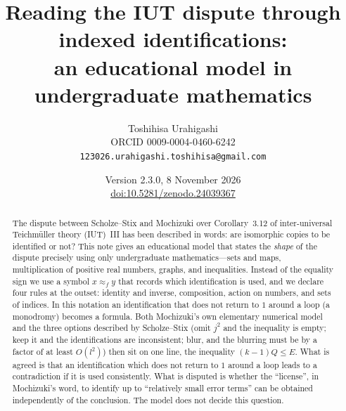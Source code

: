 \documentclass[11pt,a4paper]{article}
\title{Reading the IUT dispute through indexed identifications:\\ an educational model in undergraduate mathematics}
\author{Toshihisa Urahigashi\\\small ORCID 0009-0004-0460-6242\\\small\texttt{123026.urahigashi.toshihisa@gmail.com}}
\date{Version 2.3.0, 8 November 2026\\\small\href{https://doi.org/10.5281/zenodo.24039367}{doi:10.5281/zenodo.24039367}}
\newcommand{\q}[1]{``#1''}
\theoremstyle{plain}
\theoremstyle{definition}
\theoremstyle{remark}
\begin{document}
\maketitle

\begin{abstract}
The dispute between Scholze--Stix and Mochizuki over Corollary~3.12 of inter-universal Teichm\"uller theory (IUT)~III
has been described in words: are isomorphic copies to be identified or not? This note gives an educational model that
states the \emph{shape} of the dispute precisely using only undergraduate mathematics---sets and maps, multiplication of
positive real numbers, graphs, and inequalities. Instead of the equality sign we use a symbol $x\approx_f y$ that
records which identification is used, and we declare four rules at the outset: identity and inverse, composition,
action on numbers, and sets of indices. In this notation an identification that does not return to $1$ around a loop
(a monodromy) becomes a formula. Both Mochizuki's own elementary numerical model and the three options described by
Scholze--Stix (omit $j^2$ and the inequality is empty; keep it and the identifications are inconsistent; blur, and the
blurring must be by a factor of at least $O(l^2)$) then sit on one line, the inequality $(k-1)Q\le E$. What is agreed is that an
identification which does not return to $1$ around a loop leads to a contradiction if it is used consistently. What is
disputed is whether the \q{license}, in Mochizuki's word, to identify up to \q{relatively small error terms} can be
obtained independently of the conclusion. The model does not decide this question.


\end{abstract}
\end{document}
